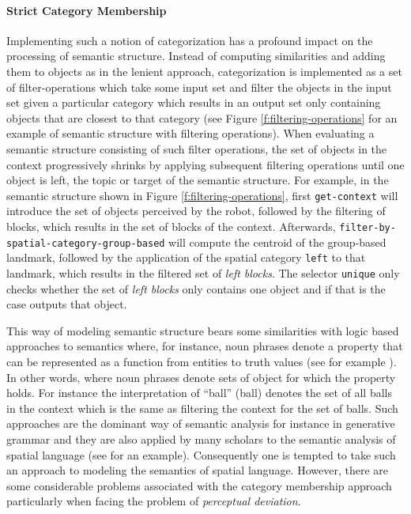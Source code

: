 \paragraph*{Strict Category Membership}
Implementing such a notion of categorization has a profound 
impact on the processing of semantic structure. Instead of computing 
similarities and adding them to objects as in the lenient approach, categorization 
is implemented as a set of filter-operations which take some input set and filter the 
objects in the input set given a particular category which results in an 
output set only containing objects that are closest to that category (see Figure 
\ref{f:filtering-operations} for an example of semantic structure with 
filtering operations). When evaluating a semantic structure
consisting of such filter operations, the set of objects in the context progressively
shrinks by applying subsequent filtering operations until one object is left, 
the topic or target of the semantic structure. For example, 
in the semantic structure shown in Figure \ref{f:filtering-operations}, first
{\footnotesize\tt get-context} will introduce the set of objects perceived by
the robot, followed by the filtering of blocks, which results in the
set of blocks of the context. Afterwards, 
{\footnotesize\tt filter-by-spatial-category-group-based} will compute the centroid
of the group-based landmark, followed by the application of the 
spatial category {\footnotesize\tt left} to that landmark, which results in the
filtered set of \emph{left blocks}. The selector {\footnotesize\tt unique} only
checks whether the set of \emph{left blocks} only contains one
object and if that is the case outputs that object.

This way of modeling semantic structure bears some similarities with
logic based approaches to semantics where, for instance, noun phrases denote a 
property that can be represented as a function from entities to truth 
values (see for example \citealp{barwise1981generalized}). 
In other words, where noun phrases denote sets of object for which
the property holds. For instance the interpretation of ``ball'' (ball) denotes 
the set of all balls in the context which is the same as filtering the context
for the set of balls. Such approaches are the dominant way of semantic
analysis for instance in generative grammar and they are also applied 
by many scholars to the semantic analysis of spatial language (see 
\citealp{eschenbach1997axiomatic} for an example). Consequently
one is tempted to take such an approach to modeling the semantics
of spatial language. However, there are some considerable problems
associated with the category membership approach particularly when 
facing the problem of \emph{perceptual deviation}.

